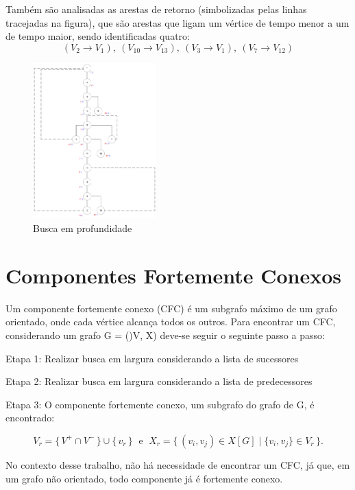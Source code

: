 Também são analisadas as arestas de retorno (simbolizadas pelas linhas tracejadas na figura), que são arestas que ligam um vértice de tempo menor a um de tempo maior, sendo identificadas quatro:
\[
(V_2 \rightarrow V_1),\ (V_{10} \rightarrow V_{13}),\ (V_3 \rightarrow V_1),\ (V_7 \rightarrow V_{12})
\]

\begin{figure}[H]
	\centering
	\includegraphics[width=0.425\textwidth]{figuras/BuscaProfundidade.png}
	\caption{Busca em profundidade}
	\label{fig:BusProf}
\end{figure}

\section{Componentes Fortemente Conexos}\label{sec:compFC}

Um componente fortemente conexo (CFC) é um subgrafo máximo de um grafo orientado, onde cada vértice alcança todos os outros. Para encontrar um CFC, considerando um grafo G = ()V, X) deve-se seguir o seguinte passo a passo:

Etapa 1: Realizar busca em largura considerando a lista de sucessores

Etapa 2: Realizar busca em largura considerando a lista de predecessores

Etapa 3: O componente fortemente conexo, um subgrafo do grafo de G, é encontrado:

\begin{equation}
	V_r = \{\,V^+ \cap V^-\,\} \cup \{\,v_r\,\} \;\text{ e }\;
	X_r = \{\, (v_i,v_j) \in X[G] \mid \{v_i,v_j\} \in V_r \,\}.
\end{equation}


No contexto desse trabalho, não há necessidade de encontrar um CFC, já que, em um grafo não orientado, todo componente já é fortemente conexo.

